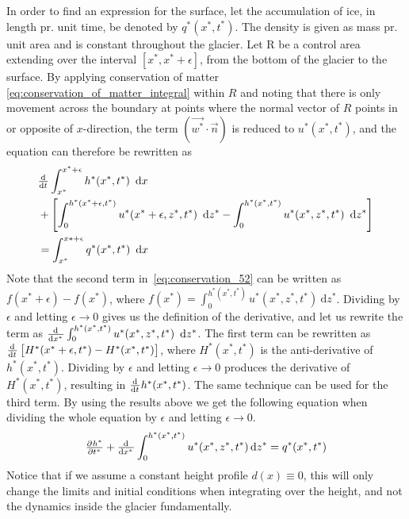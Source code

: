 In order to find an expression for the surface, let the accumulation of ice, in length pr. unit time, be denoted by $q^*(x^*, t^*)$. The density is given as mass pr. unit area and is constant throughout the glacier. Let R be a control area extending over the interval $\left[x^*, x^* + \epsilon\right]$, from the bottom of the glacier to the surface. By applying conservation of matter \eqref{eq:conservation_of_matter_integral} within $R$ and noting that there is only movement across the boundary at points where the normal vector of $R$ points in or opposite of $x$-direction, the term $(\vec{w^*}\cdot\vec{n})$ is reduced to $u^*(x^*, t^*)$, and the equation can therefore be rewritten as
%
\begin{align}
\begin{split}\label{eq:conservation_52}
    &\od{}{t}\int_{x^*}^{x^* + \epsilon}h^*(x^*, t^*)\ \dif x \\ &+ \left[\int_0^{h^*(x^* + \epsilon, t^*)}u^*(x^* + \epsilon, z^*, t^*)\ \dif{z^*} - \int_0^{h^*(x^*, t^*)}u^*(x^*, z^*, t^*)\ \dif{z^*}\right] \\ 
    &= \int_{x^*}^{x* + \epsilon}q^*(x^*, t^*)\ \dif x
\end{split}
\end{align}
Note that the second term in~\eqref{eq:conservation_52} can be written as $f(x^* + \epsilon) - f(x^*)$, where $f(x^*) = \int_0^{h^*(x^*, t^*)}u^*(x^*, z^*, t^*)\ \mathrm{d}z^*$. Dividing by $\epsilon$ and letting $\epsilon \to 0$ gives us the definition of the derivative, and let us rewrite the term as $\od{}{{x^*}} \int_0^{h^*(x^*, t^*)} u^*(x^*, z^*, t^*)\  \dif{z^*} $.
%
The first term can be rewritten as $\od{}{t}\left[H^*(x^* + \epsilon, t^*) - H^*(x^*, t^*)\right]$, where $H^*(x^*, t^*)$ is the anti-derivative of $h^*(x^*, t^*)$. Dividing by $\epsilon$ and letting $\epsilon \to 0$ produces the derivative of $H^*(x^*, t^*)$, resulting in $\od{}{t}h^*(x^*, t^*)$. The same technique can be used for the third term.
By using the results above we get the following equation when dividing the whole equation by $\epsilon$ and letting $\epsilon \to 0$.
%
\begin{equation}\label{eq:conservation_of_matter}
    \pd{{h^*}}{{t^*}} + \od{}{{x^*}}\int_0^{h^*(x^*, t^*)} u^* (x^*, z^*, t^*) \dif{z^*} = q^*(x^*, t^*)
\end{equation}
%
Notice that if we assume a constant height profile $d(x) \equiv 0$, this will only change the limits and initial conditions when integrating over the height, and not the dynamics inside the glacier fundamentally.